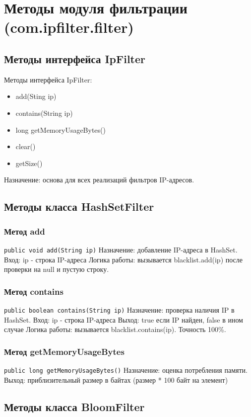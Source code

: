 \section{Методы модуля фильтрации (com.ipfilter.filter)}
\subsection{Методы интерфейса IpFilter}
Методы интерфейса IpFilter:
\begin{itemize}
    \item add(Sting ip)
    \item contains(String ip)
    \item long getMemoryUsageBytes()
    \item clear()
    \item getSize()
\end{itemize}

Назначение: основа для всех реализаций фильтров IP-адресов.

\subsection{Методы класса HashSetFilter}
\subsubsection{Метод add}
\texttt{public void add(String ip)}
Назначение: добавление IP-адреса в HashSet.
Вход: ip - строка IP-адреса
Логика работы: вызывается blacklist.add(ip) после проверки на null и пустую строку.
\subsubsection{Метод contains}
\texttt{public boolean contains(String ip)}
Назначение: проверка наличия IP в HashSet.
Вход: ip - строка IP-адреса
Выход: true если IP найден, false в ином случае
Логика работы: вызывается blacklist.contains(ip). Точность 100\%.
\subsubsection{Метод getMemoryUsageBytes}
\texttt{public long getMemoryUsageBytes()}
Назначение: оценка потребления памяти.
Выход: приблизительный размер в байтах (размер * 100 байт на элемент)

\subsection{Методы класса BloomFilter}
